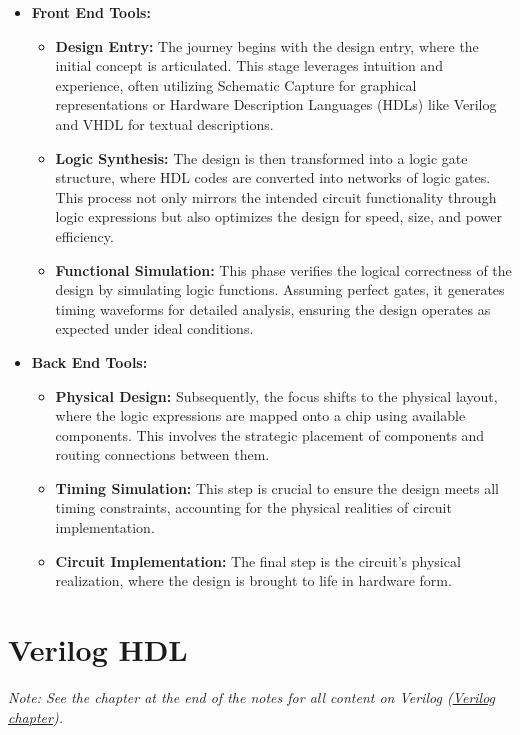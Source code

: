 \documentclass[12pt,openany]{book}
\begin{document}
			      	\begin{itemize}
			      		\item[]\textbf{Front End Tools:}
			      		      \begin{itemize}
			      		      	\item \textbf{Design Entry:} The journey begins with the design entry, where the initial concept is articulated. This stage leverages intuition and experience, often utilizing Schematic Capture for graphical representations or Hardware Description Languages (HDLs) like Verilog and VHDL for textual descriptions.
			      		      	\item \textbf{Logic Synthesis:} The design is then transformed into a logic gate structure, where HDL codes are converted into networks of logic gates. This process not only mirrors the intended circuit functionality through logic expressions but also optimizes the design for speed, size, and power efficiency.
			      		      	\item \textbf{Functional Simulation:} This phase verifies the logical correctness of the design by simulating logic functions. Assuming perfect gates, it generates timing waveforms for detailed analysis, ensuring the design operates as expected under ideal conditions.
			      		      \end{itemize}
			      		\item[]\textbf{Back End Tools:}
			      		      \begin{itemize}
			      		      	\item \textbf{Physical Design:} Subsequently, the focus shifts to the physical layout, where the logic expressions are mapped onto a chip using available components. This involves the strategic placement of components and routing connections between them.
			      		      	\item \textbf{Timing Simulation:} This step is crucial to ensure the design meets all timing constraints, accounting for the physical realities of circuit implementation.
			      		      	\item \textbf{Circuit Implementation:} The final step is the circuit's physical realization, where the design is brought to life in hardware form.
			      		      \end{itemize}
			      	\end{itemize}
			    
			      	\section{Verilog HDL}
 \textit{Note: See the chapter at the end of the notes for all content on Verilog (\hyperref[Verilog]{Verilog chapter}).}
\end{document}
